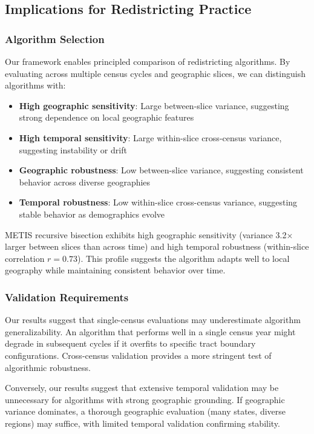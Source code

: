 \subsection{Implications for Redistricting Practice}

\subsubsection{Algorithm Selection}

Our framework enables principled comparison of redistricting algorithms. By evaluating across multiple census cycles and geographic slices, we can distinguish algorithms with:
\begin{itemize}
    \item \textbf{High geographic sensitivity}: Large between-slice variance, suggesting strong dependence on local geographic features
    \item \textbf{High temporal sensitivity}: Large within-slice cross-census variance, suggesting instability or drift
    \item \textbf{Geographic robustness}: Low between-slice variance, suggesting consistent behavior across diverse geographies
    \item \textbf{Temporal robustness}: Low within-slice cross-census variance, suggesting stable behavior as demographics evolve
\end{itemize}

METIS recursive bisection exhibits high geographic sensitivity (variance 3.2× larger between slices than across time) and high temporal robustness (within-slice correlation $r=0.73$). This profile suggests the algorithm adapts well to local geography while maintaining consistent behavior over time.

\subsubsection{Validation Requirements}

Our results suggest that single-census evaluations may underestimate algorithm generalizability. An algorithm that performs well in a single census year might degrade in subsequent cycles if it overfits to specific tract boundary configurations. Cross-census validation provides a more stringent test of algorithmic robustness.

Conversely, our results suggest that extensive temporal validation may be unnecessary for algorithms with strong geographic grounding. If geographic variance dominates, a thorough geographic evaluation (many states, diverse regions) may suffice, with limited temporal validation confirming stability.

